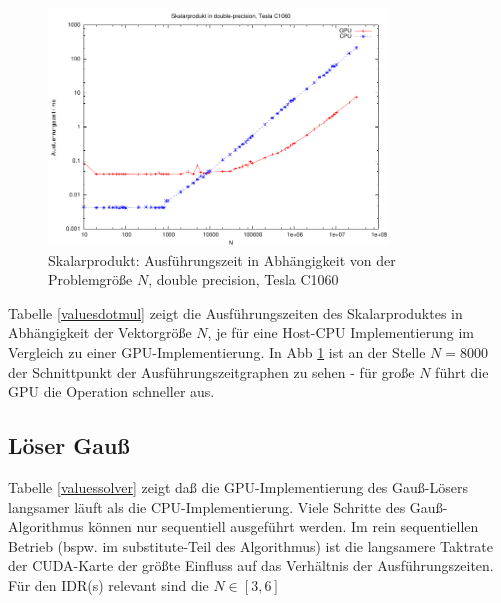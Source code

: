 \documentclass[journal]{IEEEtran}
\begin{document}
\begin{figure}[htbp]

   \includegraphics[width=9cm]{dotmul/d/dotmul.pdf}

   \caption{ \label{dotmul} Skalarprodukt: Ausführungszeit in Abhängigkeit von der Problemgröße $N$, double precision, Tesla C1060}%

\end{figure}


Tabelle \ref{valuesdotmul} zeigt die Ausführungszeiten des Skalarproduktes
in Abhängigkeit der Vektorgröße $N$, je für eine Host-CPU Implementierung im
Vergleich zu einer GPU-Implementierung.
In Abb \ref{dotmul} ist an der Stelle $N = 8000$ der Schnittpunkt der
Ausführungszeitgraphen zu sehen - für große $N$ führt die GPU die Operation
schneller aus.




\subsection{Löser Gauß}

Tabelle \ref{valuessolver} zeigt daß die GPU-Implementierung des Gauß-Lösers
langsamer läuft als die CPU-Implementierung. Viele Schritte des Gauß-Algorithmus
können nur sequentiell ausgeführt werden. Im rein sequentiellen
Betrieb (bspw. im substitute-Teil des Algorithmus) ist die langsamere Taktrate
der CUDA-Karte der größte Einfluss auf das Verhältnis der Ausführungszeiten.
Für den IDR(s) relevant sind die $N \in[3,6]$
\end{document}
